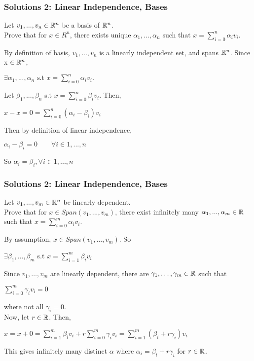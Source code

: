 \documentclass{beamer}
\newcommand\Fonteight{\fontsize{8}{9.6}\selectfont}
\renewenvironment{enumerate}%
{\begin{list}{\arabic{enumi}.}%
      {\setlength{\leftmargin}{2.5em}%
       \setlength{\itemsep}{-\parsep}%
       \setlength{\topsep}{-\parskip}%
       \usecounter{enumi}}%
 }{\end{list}}
\begin{document}
\begin{frame}
\frametitle{Solutions 2: Linear Independence, Bases}
\begin{enumerate}
	\item[2.] Let $v_1,...,v_n \in \mathbb{R}^n$ be a basis of $\mathbb{R}^n$. \\
		Prove that for $x \in R^n$, there exists unique $\alpha_1,...,\alpha_n$
		such that $x = \sum_{i=0}^n \alpha_i v_i$.
	\begin{solution}
	By definition of basis, $v_1,...,v_n$ is a linearly independent set, and spans $\mathbb{R}^n$. Since x $\in \mathbb{R}^n$, 
	\begin{center}
		$\exists \alpha_1,...,\alpha_n \text{ s.t } x = \sum_{i=0}^n \alpha_i v_i.$ 
	\end{center}
	Let $\beta_1,...,\beta_n$ s.t $x = \sum_{i=0}^n \beta_i v_i$. Then,
	\begin{center}
		$x-x=0=\sum_{i=0}^n (\alpha_i-\beta_i) v_i$
	\end{center} 
	Then by definition of linear independence, 
	\begin{center}
		$\alpha_i-\beta_i=0  \qquad \forall i \in 1,...,n$
	\end{center}
	So $\alpha_i=\beta_i, \forall i \in 1,...,n$ 
	\end{solution}
\end{enumerate}
\end{frame}

\begin{frame}
\frametitle{Solutions 2: Linear Independence, Bases}
\begin{enumerate}
\item[3.] Let $v_1,...,v_m \in \mathbb{R}^n$ be linearly dependent. \\
Prove that for $x \in Span(v_1,...,v_m)$, 
there exist infinitely many $\alpha_1,...,\alpha_m \in \mathbb{R}$ 
such that $x = \sum_{i=0}^m \alpha_i v_i$.
\begin{solution}
    \Fonteight
    By assumption, $x\in Span(v_1,\ldots,v_m)$. So
    \begin{center}
    $\exists \beta_1,...,\beta_m$ s.t $x=\sum_{i=1}^m \beta_iv_i$
    \end{center}
    
    Since $v_1,\ldots,v_m$ are linearly dependent, there are $\gamma_1,\ldots,\gamma_m\in \mathbb{R}$ such that
    \begin{center} $\sum_{i=0}^m\gamma_i v_i= 0$ \end{center}
    where not all $\gamma_i=0$.  \\
    Now, let $r \in \mathbb{R}$. Then,
    \begin{center} $x = x+0 = \sum_{i=1}^m \beta_iv_i + r\sum_{i=0}^m\gamma_i v_i
    =  \sum_{i=1}^m (\beta_i +r\gamma_i)v_i $ \end{center} 
    This gives infinitely many distinct $\alpha$ where $\alpha_i=\beta_i+r\gamma_i$ for $r\in\mathbb{R}$.

\end{solution}
\end{enumerate}
\end{frame}
\end{document}
